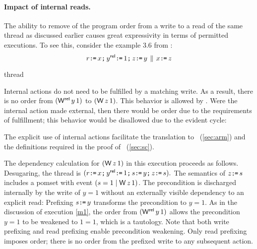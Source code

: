 \paragraph{Impact of internal reads.}
The ability to remove of the program order from a write to a read of the same thread as discussed earlier causes great expressivity in terms of permitted executions.  To see this, consider the example 3.6 from
\cite{DBLP:journals/pacmpl/PodkopaevLV19}:
\begin{displaymath}
  r\texttt{:}\mkern-1mu\texttt{=}\, x\texttt{;}\,\allowbreak
  y^{\mathsf{rel}}\texttt{:}\mkern-1mu\texttt{=}\, 1\texttt{;}\,\allowbreak
  z\texttt{:}\mkern-1mu\texttt{=}\, y
  \,\mathbin{\|}\,
  x\texttt{:}\mkern-1mu\texttt{=}\, z
\end{displaymath}
\begin{tikzdisplaylabel}[node distance=1em]{thread}
\end{tikzdisplaylabel}
Internal actions do not need to be fulfilled by a matching write.  As a
result, there is no order from $(\DWRel{y}{1})$ to $(\DW{z}{1})$.  This behavior is
allowed by \armeight.  Were the internal action made external,
then there would be order due to the requirements of fulfillment; this behavior would be disallowed due to the
evident cycle:
\begin{tikzdisplay}[node distance=1em]
\end{tikzdisplay}
The explicit use of internal actions facilitate the translation to \armeight\
(\textsection\ref{sec:arm}) and the definitions required in the proof of
\drfsc\ (\textsection\ref{sec:sc}).

The dependency calculation for $(\DW{z}{1})$ in this execution proceeds as
follows.  Desugaring, the thread is
\begin{math}
  (r\texttt{:}\mkern-1mu\texttt{=}\, x\texttt{;}\,\allowbreak
  y^{\mathsf{rel}}\texttt{:}\mkern-1mu\texttt{=}\, 1\texttt{;}\,\allowbreak
  s\texttt{:}\mkern-1mu\texttt{=}\, y\texttt{;}\,\allowbreak
  z\texttt{:}\mkern-1mu\texttt{=}\, s).
\end{math}
The semantics of $z\texttt{:}\mkern-1mu\texttt{=}\, s$ includes a pomset with event
$(\bReg=1\mid \DW{z}{1})$. The precondition is discharged internally by the
write of $y=1$ without an externally visible dependency to an explicit read:
Prefixing $s\texttt{:}\mkern-1mu\texttt{=}\, y$ transforms the precondition to $y=1$.  As in the
discussion of execution \eqref{m1}, the order from $(\DWRel{y}{1})$
allows the precondition $y=1$ to be weakened to $1=1$, which is a tautology.
Note that both write prefixing and read prefixing enable precondition
weakening.  Only read prefixing imposes order; there is no order from
the prefixed write to any subsequent action.

